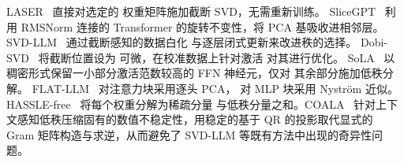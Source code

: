 LASER~\citep{LASER_2024} 直接对选定的
权重矩阵施加截断 SVD，无需重新训练。
SliceGPT~\citep{slicegpt2024} 利用 RMSNorm 连接的
Transformer 的旋转不变性，将 PCA 基吸收进相邻层。
SVD-LLM~\citep{svdllm2025} 通过截断感知的数据白化
与逐层闭式更新来改进秩的选择。
Dobi-SVD~\citep{wang2025dobisvd} 将截断位置设为
可微，在校准数据上针对激活
对其进行优化。
SoLA~\citep{huang2025sola} 以稠密形式保留一小部分激活范数较高的
FFN 神经元，仅对
其余部分施加低秩分解。
FLAT-LLM~\citep{tian2025flatllm} 对注意力块采用逐头 PCA，
对 MLP 块采用 Nystr\"{o}m 近似。
HASSLE-free~\citep{hasslefree2025} 将每个权重分解为稀疏分量
与低秩分量之和。COALA~\cite{parkina2026coala} 针对上下文感知低秩压缩固有的数值不稳定性，用稳定的基于 QR 的投影取代显式的 Gram 矩阵构造与求逆，从而避免了 SVD-LLM 等既有方法中出现的奇异性问题。

